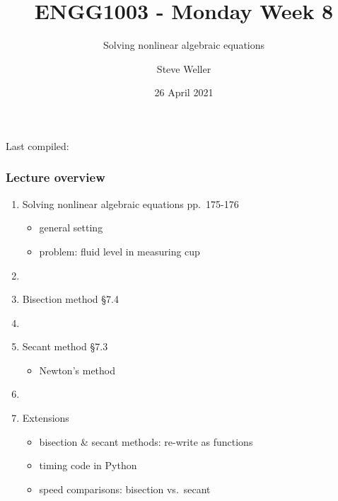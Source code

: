 \documentclass[english,14pt]{beamer}
\title{ENGG1003 - Monday Week 8}
\subtitle{Solving nonlinear algebraic equations }%
\author{Steve Weller}
\institute{University of Newcastle}
\date{26 April 2021}
\newcommand\red[1]{{\color{red} #1}}
\begin{document}
\begin{flushleft}
{\scriptsize Last compiled:~\DTMnow}
\vspace*{-5mm}
\end{flushleft}
\framebreak


\begin{frame}[fragile]

\frametitle{Lecture overview}
\begin{enumerate}
	\item Solving nonlinear algebraic equations \red{pp.~175-176}
	\begin{itemize}
		\item general setting
		\item problem: fluid level in measuring cup
	\end{itemize}
	
	\item[]
	
	\item Bisection method \red{\S7.4}
	
	\item[]
	
	\item Secant method \red{\S7.3}
	\begin{itemize}
		\item Newton's method
	\end{itemize}
	
	\item[]
	
	\item Extensions
	\begin{itemize}
		\item bisection \& secant methods: re-write as functions
		\item timing code in Python
		\item speed comparisons: bisection vs.~secant
	\end{itemize}
	
\end{enumerate}

\end{frame}

\end{document}

